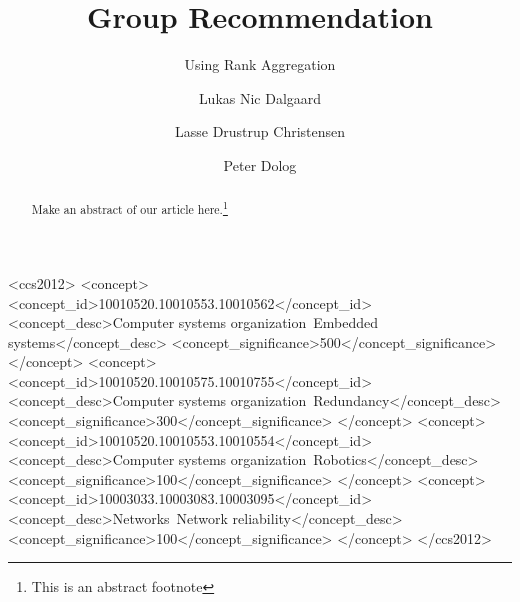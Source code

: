 \documentclass[sigconf]{acmart}
\begin{document}
\title{Group Recommendation}
\subtitle{Using Rank Aggregation}


\author{Lukas Nic Dalgaard}

\author{Lasse Drustrup Christensen}

\author{Peter Dolog}





\begin{abstract}
Make an abstract of our article here.\footnote{This is an abstract footnote}
\end{abstract}

%
%

\iffalse
\begin{CCSXML}
<ccs2012>
 <concept>
  <concept_id>10010520.10010553.10010562</concept_id>
  <concept_desc>Computer systems organization~Embedded systems</concept_desc>
  <concept_significance>500</concept_significance>
 </concept>
 <concept>
  <concept_id>10010520.10010575.10010755</concept_id>
  <concept_desc>Computer systems organization~Redundancy</concept_desc>
  <concept_significance>300</concept_significance>
 </concept>
 <concept>
  <concept_id>10010520.10010553.10010554</concept_id>
  <concept_desc>Computer systems organization~Robotics</concept_desc>
  <concept_significance>100</concept_significance>
 </concept>
 <concept>
  <concept_id>10003033.10003083.10003095</concept_id>
  <concept_desc>Networks~Network reliability</concept_desc>
  <concept_significance>100</concept_significance>
 </concept>
</ccs2012>  
\end{CCSXML}
\end{document}
